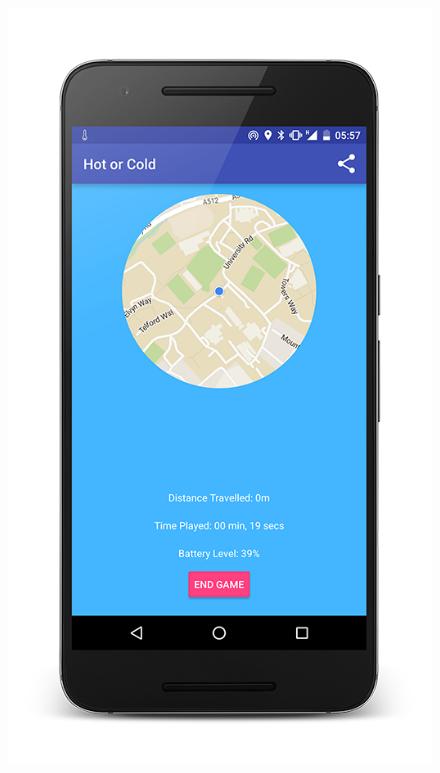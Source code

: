 \documentclass[10pt, a4paper]{article}
\begin{document}
\begin{figure}[!htb]
  \includegraphics[width=1.0\textwidth]{phone_game_1}
  \caption{}
\endminipage\hfill
{}

\end{figure}
\end{document}
